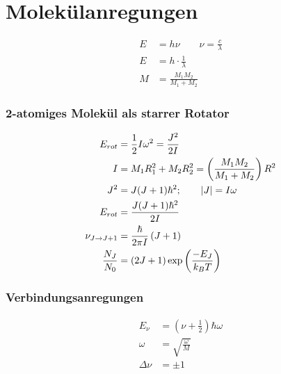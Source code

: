 \section{Molekülanregungen}


\begin{equation*}
    \begin{aligned}
        E &= h \nu \qquad \nu = \frac{c}{\lambda} \\
        E &= h \cdot \frac{1}{\lambda} \\
        M &= \frac{M_1 M_2}{M_1 + M_2}
    \end{aligned}
\end{equation*}

\subsubsection*{2-atomiges Molekül als starrer Rotator}

\begin{equation*}
    \begin{aligned}
        E_{rot} &= \frac{1}{2} I \omega^2 = \frac{J^2}{2 I} \\
        I &= M_1R_1^2 + M_2R_2^2 = \left(\frac{M_1M_2}{M_1 + M_2}\right) R^2 \\
        J^2 &= J(J+1) \hbar^2 ; \qquad \left\vert J\right\vert = I\omega \\
        E_{rot} &= \frac{J(J+1)\hbar^2}{2I} \\
        \nu_{J \rightarrow J+1} &= \frac{\hbar}{2 \pi I} \left(J+1\right) \\
        \frac{N_J}{N_0} &= \left(2J+1\right) \exp \left(\frac{-E_J}{k_BT}\right)
    \end{aligned}
\end{equation*}

\subsubsection*{Verbindungsanregungen}

\begin{equation*}
    \begin{aligned}
        E_\nu &= \left(\nu + \frac{1}{2}\right) \hbar \omega \\
        \omega &= \sqrt{\frac{\omega}{M}} \\
        \Delta \nu &= \pm 1
    \end{aligned}
\end{equation*}

